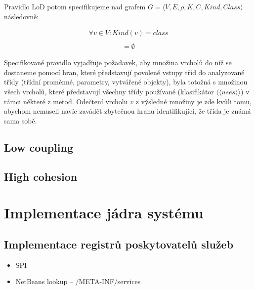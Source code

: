 Pravidlo LoD potom specifikujeme nad grafem $G = \langle V, E, \rho, K, C, \mathit{Kind}, \mathit{Class}\rangle$ následovně:

\begin{align*}
\forall v \in V: Kind(v) = class\\
\end{align*}
\begin{align*}
[((&F(G, v, class, \langle\langle{}has\_field\rangle\rangle{}) \cup F(G, v, class, \langle\langle{}has\_param\rangle\rangle{}) \cup\\
&F(G, v, class, \langle\langle{}instantiates\rangle\rangle{})) \cap F(v, class, \langle\langle{}uses\rangle\rangle{}) \setminus \{v\}] = \emptyset
\end{align*}

Specifikované pravidlo vyjadřuje požadavek, aby množina vrcholů do níž se dostaneme pomocí hran, které představují povolené vstupy tříd do analyzované třídy (třídní proměnné, parametry, vytvářené objekty), byla totožná s množinou všech vrcholů, které představují všechny třídy používané (klasifikátor $\langle\langle{}uses\rangle\rangle$) v rámci některé z metod. Odečtení vrcholu $v$ z výsledné množiny je zde kvůli tomu, abychom nemuseli navíc zavádět zbytečnou hranu identifikující, že třída je známá sama sobě.

\subsection{Low coupling}

\subsection{High cohesion}

\section{Implementace jádra systému}

\subsection{Implementace registrů poskytovatelů služeb}
\begin{itemize}
\item SPI
\item NetBeans lookup -- /META-INF/services
\end{itemize}

